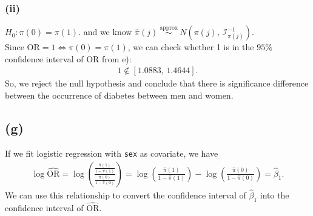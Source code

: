 \subsubsection*{(ii)}
$H_{0}: \pi(0) = \pi(1)$. and we know $\widehat{\pi}(j) ~\overset{\mathrm{approx}}{\sim}~ N\left(\pi(j), \, \mathcal{I}_{\pi(j)}^{-1}\right)$.\\

Since $\mathrm{OR} = 1 \iff \pi(0) = \pi(1)$, we can check whether 1 is in the $95\%$ confidence interval of OR from e):
\begin{align*}
1 \notin [1.0883, \, 1.4644].
\end{align*}
So, we reject the null hypothesis and conclude that there is significance difference between the occurrence of diabetes between men and women.


\vspace{\baselineskip}
\subsection*{(g)}
If we fit logistic regression with \texttt{sex} as covariate, we have
\begin{align*}
\log\widehat{\mathrm{OR}} = \log\left(\frac{\frac{\widehat{\pi}(1)}{1-\widehat{\pi}(1)}}{\frac{\widehat{\pi}(0)}{1-\widehat{\pi}(0)}}\right) = \log\left(\frac{\widehat{\pi}(1)}{1-\widehat{\pi}(1)}\right) - \log\left(\frac{\widehat{\pi}(0)}{1-\widehat{\pi}(0)}\right)= \widehat{\beta}_{1}.
\end{align*}
We can use this relationship to convert the confidence interval of $\widehat{\beta}_{1}$ into the confidence interval of $\widehat{\mathrm{OR}}$.

